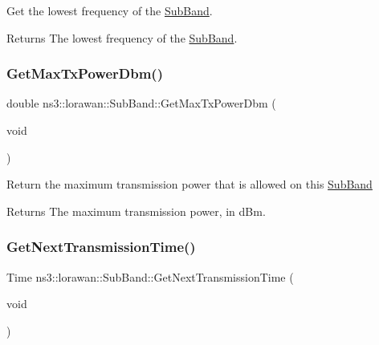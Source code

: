 Get the lowest frequency of the \hyperlink{classns3_1_1lorawan_1_1SubBand}{Sub\+Band}.

\begin{DoxyReturn}{Returns}
The lowest frequency of the \hyperlink{classns3_1_1lorawan_1_1SubBand}{Sub\+Band}. 
\end{DoxyReturn}
\mbox{\label{classns3_1_1lorawan_1_1SubBand_ae8a66a1d4c75b67f98c045b906cae2f9}} 
\subsubsection{\texorpdfstring{Get\+Max\+Tx\+Power\+Dbm()}{GetMaxTxPowerDbm()}}
{\footnotesize\ttfamily double ns3\+::lorawan\+::\+Sub\+Band\+::\+Get\+Max\+Tx\+Power\+Dbm (\begin{DoxyParamCaption}\item[{void}]{ }\end{DoxyParamCaption})}

Return the maximum transmission power that is allowed on this \hyperlink{classns3_1_1lorawan_1_1SubBand}{Sub\+Band}

\begin{DoxyReturn}{Returns}
The maximum transmission power, in d\+Bm. 
\end{DoxyReturn}
\mbox{\label{classns3_1_1lorawan_1_1SubBand_a5303173d70f98effe8586d34d83172d8}} 
\subsubsection{\texorpdfstring{Get\+Next\+Transmission\+Time()}{GetNextTransmissionTime()}}
{\footnotesize\ttfamily Time ns3\+::lorawan\+::\+Sub\+Band\+::\+Get\+Next\+Transmission\+Time (\begin{DoxyParamCaption}\item[{void}]{ }\end{DoxyParamCaption})}

